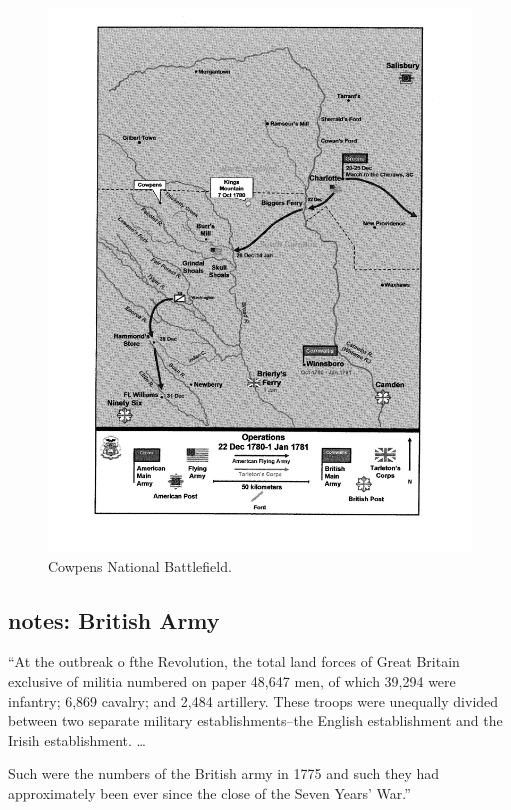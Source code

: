 \begin{figure}[h]
	\singlespacing
	\begin{center}
	  \includegraphics[width=6in]{gfx/rauch_battle_2007_05_p22}
	\end{center}
	\caption{Cowpens National Battlefield.}
	\label{cowppark97}
\end{figure}
\lipsum[9]


\subsection{notes: British Army}
``At the outbreak o fthe Revolution, the total land forces of Great Britain
exclusive of militia numbered on paper 48,647 men, of which 39,294 were
infantry; 6,869 cavalry; and 2,484 artillery. These troops were unequally
divided between two separate military establishments--the English establishment
and the Irisih establishment. \ldots

Such were the numbers of the British army in 1775 and such they had
approximately been ever since the close of the Seven Years' War.''\cite[1]{curtis_org_1972}

